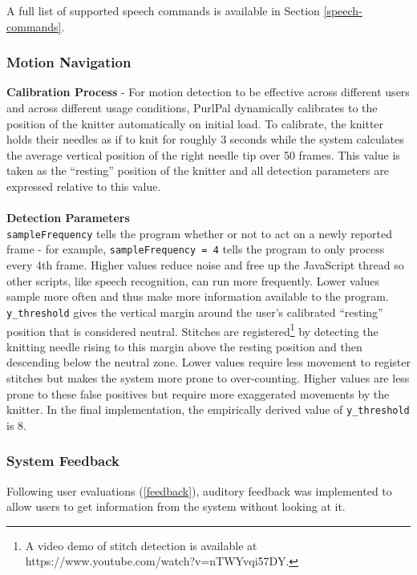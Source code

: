 \documentclass[11pt,twocolumn]{article}
\begin{document}
A full list of supported speech commands is available in Section \ref{speech-commands}.

\subsubsection{Motion Navigation} \label{leapNav}

\textbf{Calibration Process} - For motion detection to be effective across different users and across different usage conditions, PurlPal dynamically calibrates to the position of the knitter automatically on initial load.
To calibrate, the knitter holds their needles as if to knit for roughly 3 seconds while the system calculates the average vertical position of the right needle tip over 50 frames.
This value is taken as the ``resting'' position of the knitter and all detection parameters are expressed relative to this value.
\\ \\
\textbf{Detection Parameters} \\
\texttt{sampleFrequency} tells the program whether or not to act on a newly reported frame - for example, \texttt{sampleFrequency = 4} tells the program to only process every 4th frame.
Higher values reduce noise and free up the JavaScript thread so other scripts, like speech recognition, can run more frequently.
Lower values sample more often and thus make more information available to the program. \\
\texttt{y\_threshold} gives the vertical margin around the user's calibrated ``resting'' position that is considered neutral.
Stitches are registered\footnote{A video demo of stitch detection is available at https://www.youtube.com/watch?v=nTWYvqi57DY.} by detecting the knitting needle rising to this margin above the resting position and then descending below the neutral zone.
Lower values require less movement to register stitches but makes the system more prone to over-counting.
Higher values are less prone to these false positives but require more exaggerated movements by the knitter.
In the final implementation, the empirically derived value of \texttt{y\_threshold} is 8.

\subsubsection{System Feedback} \label{aud-feedback}

Following user evaluations (\ref{feedback}), auditory feedback was implemented to allow users to get information from the system without looking at it.
\end{document}

